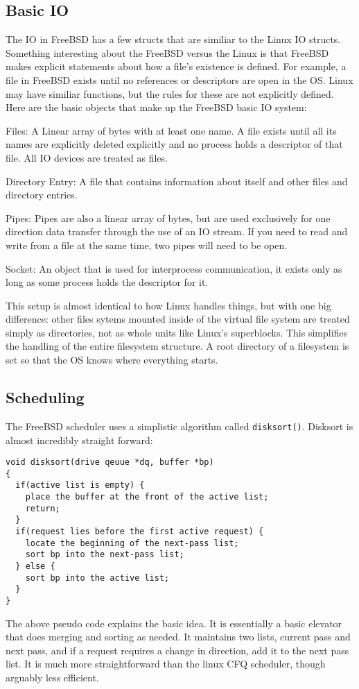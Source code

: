  \subsection{Basic IO}
 The IO in FreeBSD has a few structs that are similiar to the Linux IO structs.
 Something interesting about the FreeBSD versus the Linux is that FreeBSD
 makes explicit statements about how a file's existence is defined. For example,
 a file in FreeBSD exists until no references or descriptors are open in the OS.
 Linux may have similiar functions, but the rules for these are not explicitly
 defined. Here are the basic objects that make up the FreeBSD basic IO system:
 \cite{freebsd2016}
 \begin{description}
   \item Files: A Linear array of bytes with at least one name. A file exists
   until all its names are explicitly deleted explicitly and no process holds a
   descriptor of that file. All IO devices are treated as files.
   \item Directory Entry: A file that contains information about itself and
   other files and directory entries.
   \item Pipes: Pipes are also a linear array of bytes, but are used exclusively
   for one direction data transfer through the use of an IO stream. If you need
   to read and write from a file at the same time, two pipes will need to be open.
   \item Socket: An object that is used for interprocess communication, it exists
   only as long as some process holds the descriptor for it.
 \end{description}

 This setup is almost identical to how Linux handles things, but with one big
 difference: other files sytems mounted inside of the virtual file system are treated simply
 as directories, not as whole units like Linux's superblocks. This simplifies
 the handling of the entire filesystem structure. A root directory of a filesystem
 is set so that the OS knows where everything starts.

 \subsection{Scheduling}
 The FreeBSD scheduler uses a simplistic algorithm called \texttt{disksort()}.
 Disksort is almost incredibly straight forward: \cite{kirkgeorgebsd}
 \begin{lstlisting}
void disksort(drive qeuue *dq, buffer *bp)
{
  if(active list is empty) {
    place the buffer at the front of the active list;
    return;
  }
  if(request lies before the first active request) {
    locate the beginning of the next-pass list;
    sort bp into the next-pass list;
  } else {
    sort bp into the active list;
  }
}
 \end{lstlisting}
 The above pseudo code explains the basic idea. It is essentially a basic elevator
 that does merging and sorting as needed. It maintains two lists, current pass
 and next pass, and if a request requires a change in direction, add it to the
 next pass list. It is much more straightforward than the linux CFQ scheduler, though
 arguably less efficient. \cite{freebsd2016}

